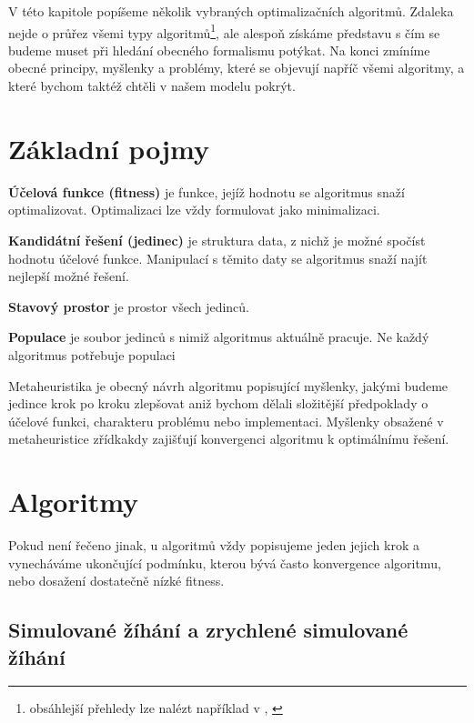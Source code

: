 
V této kapitole popíšeme několik vybraných optimalizačních algoritmů. Zdaleka nejde o průřez všemi typy algoritmů\footnote{obsáhlejší přehledy lze nalézt například v \cite[p.~23]{GO ebook}, \cite{wiki metaheur}}, ale alespoň získáme představu s čím se budeme muset při hledání obecného formalismu potýkat. Na konci zmíníme obecné principy, myšlenky a problémy, které se objevují napříč všemi algoritmy, a které bychom taktéž chtěli v našem modelu pokrýt.

\section{Základní pojmy}

\par{\textbf{Účelová funkce (fitness)} je funkce, jejíž hodnotu se algoritmus snaží optimalizovat. Optimalizaci lze vždy formulovat jako minimalizaci.}

\par{\textbf{Kandidátní řešení (jedinec)} je struktura data, z nichž je možné spočíst hodnotu účelové funkce. Manipulací s těmito daty se algoritmus snaží najít nejlepší možné řešení.}

\par{\textbf{Stavový prostor} je prostor všech jedinců.}

\par{\textbf{Populace} je soubor jedinců s nimiž algoritmus aktuálně pracuje. Ne každý algoritmus potřebuje populaci}

\par{Metaheuristika je obecný návrh algoritmu popisující myšlenky, jakými budeme jedince krok po kroku zlepšovat aniž bychom dělali složitější předpoklady o účelové funkci, charakteru problému nebo implementaci. Myšlenky obsažené v metaheuristice zřídkakdy zajišťují konvergenci algoritmu k optimálnímu řešení.}

\section{Algoritmy}

Pokud není řečeno jinak, u algoritmů vždy popisujeme jeden jejich krok a vynecháváme ukončující podmínku, kterou bývá často konvergence algoritmu, nebo dosažení dostatečně nízké fitness.

\subsection{Simulované žíhání a zrychlené simulované žíhání}

